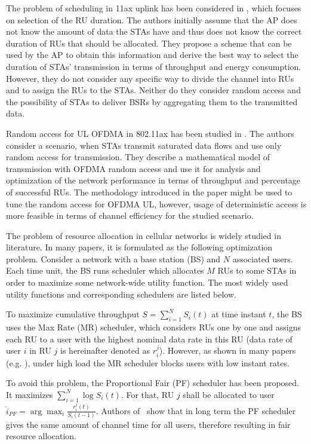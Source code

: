 The problem of scheduling in 11ax uplink has been considered in \cite{karaca2016resource}, which focuses on selection of the RU duration.
The authors initially assume that the AP does not know the amount of data the STAs have and thus does not know the correct duration of RUs that should be allocated.
They propose a scheme that can be used by the AP to obtain this information and derive the best way to select the duration of STAs' transmission in terms of throughput and energy consumption.
However, they do not consider any specific way to divide the channel into RUs and to assign the RUs to the STAs.
Neither do they consider random access and the possibility of STAs to deliver BSRs by aggregating them to the transmitted data.


Random access for UL OFDMA in 802.11ax has been studied in \cite{lanante2017performance}.
The authors consider a scenario, when STAs transmit saturated data flows and use only random access for transmission.
They describe a mathematical model of transmission with OFDMA random access and use it for analysis and optimization of the network performance in terms of throughput and percentage of successful RUs.
The methodology introduced in the paper might be used to tune the random access for OFDMA UL, however, usage of deterministic access is more feasible in terms of channel efficiency for the studied scenario.

The problem of resource allocation in cellular networks is widely studied in literature.
In many papers, it is formulated as the following optimization problem.
Consider a network with a base station (BS) and $N$ associated users.
Each time unit, the BS runs scheduler which allocates $M$ RUs to some STAs in order to maximize some network-wide utility function.
The most widely used utility functions and corresponding schedulers are listed below. 

To maximize cumulative throughput $S = \sum_{i=1}^N S_i(t)$ at time instant $t$, the BS uses the Max Rate (MR) scheduler, which considers RUs one by one and assigns each RU to a user with the highest nominal data rate in this RU (data rate of user $i$ in RU $j$ is hereinafter denoted as $r_{i}^{j}$).
However, as shown in many papers (e.g. \cite{capozzi2013downlink}), under high load the MR scheduler blocks users with low instant rates.

To avoid this problem, the Proportional Fair (PF) scheduler has been proposed.
It maximizes $\sum_{i=1}^{N} \log{S_i(t)}$.
For that, RU $j$ shall be allocated to user $\hat{i}_{PF}= \arg \max_i \frac{r_i^{j}(t)}{S_{i}(t-1)}.$
Authors of~\cite{kwan2009proportional} show that in long term the PF scheduler gives the same amount of channel time for all users, therefore resulting in fair resource allocation.

